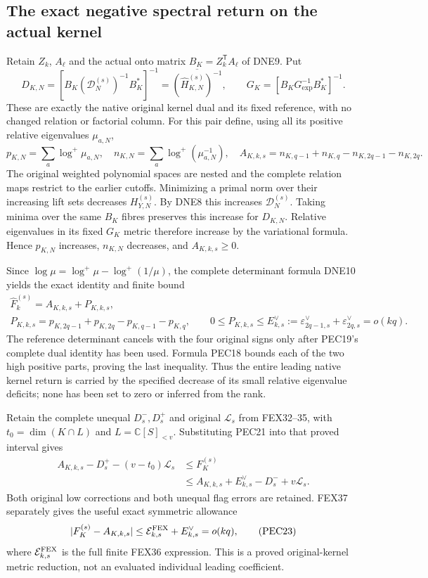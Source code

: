 \documentclass[11pt,a4paper]{article}
\begin{document}
\subsection{The exact negative spectral return on the actual kernel}
Retain $Z_k$, $A_\ell$ and the actual onto matrix
$B_K=Z_k^{\mathsf T}A_\ell$ of DNE9. Put
\[
 D_{K,N}=[B_K(\mathcal D_N^{(s)})^{-1}B_K^*]^{-1}
       =\overline{(\widehat H_{K,N}^{(s)})^{-1}},\qquad
 G_K=[B_KG_{\exp}^{-1}B_K^*]^{-1}.
 \tag{PEC19}
\]
These are exactly the native original kernel dual and its fixed
reference, with no changed relation or factorial column. For this
pair define, using all its positive relative eigenvalues $\mu_{a,N}$,
\[
 p_{K,N}=\sum_a\log^+\mu_{a,N},\quad
 n_{K,N}=\sum_a\log^+(\mu_{a,N}^{-1}),\quad
 A_{K,k,s}=n_{K,q-1}+n_{K,q}-n_{K,2q-1}-n_{K,2q}.
 \tag{PEC20}
\]
The original weighted polynomial spaces are nested and the complete
relation maps restrict to the earlier cutoffs. Minimizing a primal
norm over their increasing lift sets decreases $H_{Y,N}^{(s)}$.
By DNE8 this increases $\mathcal D_N^{(s)}$. Taking minima over the
same $B_K$ fibres preserves this increase for $D_{K,N}$. Relative
eigenvalues in its fixed $G_K$ metric therefore increase by the
variational formula. Hence $p_{K,N}$ increases, $n_{K,N}$ decreases,
and $A_{K,k,s}\ge0$.

Since $\log\mu=\log^+\mu-\log^+(1/\mu)$, the complete determinant
formula DNE10 yields the exact identity and finite bound
\[
\begin{gathered}
 \widehat F_k^{(s)}=A_{K,k,s}+P_{K,k,s},\\
 P_{K,k,s}=p_{K,2q-1}+p_{K,2q}-p_{K,q-1}-p_{K,q},\qquad
 0\le P_{K,k,s}\le
 E_{k,s}^{\vee}:=\varepsilon_{2q-1,s}^{\vee}
                       +\varepsilon_{2q,s}^{\vee}=o(kq).
\end{gathered}\tag{PEC21}
\]
The reference determinant cancels with the four original signs only
after PEC19's complete dual identity has been used. Formula PEC18
bounds each of the two high positive parts, proving the last inequality.
Thus the entire leading native kernel return is carried by the specified
decrease of its small relative eigenvalue deficits; none has been set
to zero or inferred from the rank.

Retain the complete unequal $D_s^-,D_s^+$ and original $\mathcal L_s$
from FEX32--35, with $t_0=\dim(K\cap L)$ and $L=\mathbb C[S]_{<v}$.
Substituting PEC21 into that proved interval gives
\[
\begin{split}
 A_{K,k,s}-D_s^+-(v-t_0)\mathcal L_s
 &\le F_K^{(s)}\\
 &\le A_{K,k,s}+E_{k,s}^{\vee}-D_s^-+v\mathcal L_s.
\end{split}\tag{PEC22}
\]
Both original low corrections and both unequal flag errors are retained.
FEX37 separately gives the useful exact symmetric allowance
\[
 |F_K^{(s)}-A_{K,k,s}|
   \le\mathcal E_{k,s}^{\rm FEX}+E_{k,s}^{\vee}=o(kq),
 \tag{PEC23}
\]
where $\mathcal E_{k,s}^{\rm FEX}$ is the full finite FEX36 expression.
This is a proved original-kernel metric reduction, not an evaluated
individual leading coefficient.
\end{document}
